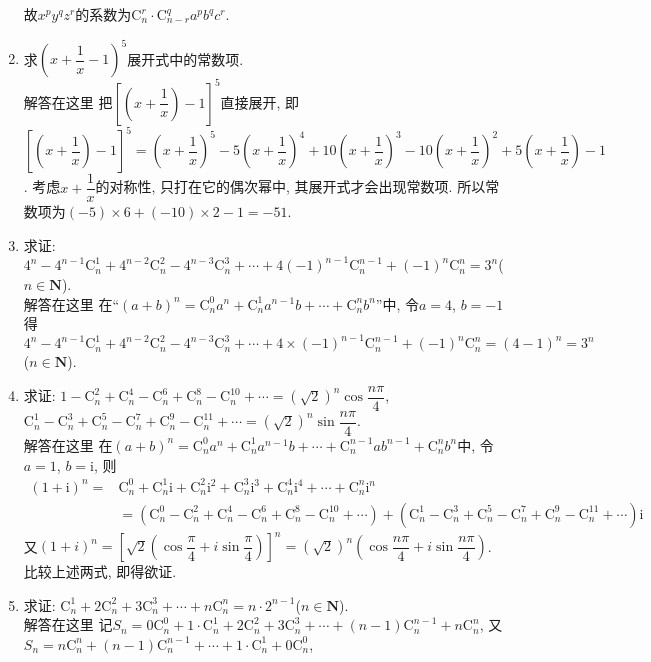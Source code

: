 \documentclass[10pt,a4paper]{article}
\begin{document}
\begin{enumerate}[1.]
故$x^py^qz^r$的系数为$\mathrm{C}_n^r\cdot \mathrm{C}_{n-r}^qa^pb^qc^r$.
\item 求$(x+\dfrac 1x-1)^5$展开式中的常数项.\\
解答在这里  把$[(x+\dfrac 1x)-1]^5$直接展开,
即$[(x+\dfrac 1x)-1]^5=(x+\dfrac 1x)^5-5(x+\dfrac 1x)^4+10(x+\dfrac 1x)^3-10(x+\dfrac 1x)^2+5(x+\dfrac 1x)-1$.
考虑$x+\dfrac 1x$的对称性, 只打在它的偶次幂中, 其展开式才会出现常数项.
所以常数项为$(-5)\times 6+(-10)\times 2-1=-51$.
\item 求证: $4^n-4^{n-1}\mathrm{C}_n^1+4^{n-2}\mathrm{C}_n^2-4^{n-3}\mathrm{C}_n^3+\cdots +4(-1)^{n-1}\mathrm{C}_n^{n-1}+(-1)^n\mathrm{C}_n^n=3^n$($n\in \mathbf{N}$).\\
解答在这里  在``$(a+b)^n=\mathrm{C}_n^0a^n+\mathrm{C}_n^1a^{n-1}b+\cdots +\mathrm{C}_n^nb^n$''中, 令$a=4$, $b=-1$得
$4^n-4^{n-1}\mathrm{C}_n^1+4^{n-2}\mathrm{C}_n^2-4^{n-3}\mathrm{C}_n^3+\cdots +4\times (-1)^{n-1}\mathrm{C}_n^{n-1}+(-1)^n\mathrm{C}_n^n=(4-1)^n=3^n$($n\in \mathbf{N}$).
\item 求证: $1-\mathrm{C}_n^2+\mathrm{C}_n^4-\mathrm{C}_n^6+\mathrm{C}_n^8-\mathrm{C}_n^{10}+\cdots =(\sqrt 2)^n\cos \dfrac{n\pi }4$,
$\mathrm{C}_n^1-\mathrm{C}_n^3+\mathrm{C}_n^5-\mathrm{C}_n^7+\mathrm{C}_n^9-\mathrm{C}_n^{11}+\cdots =(\sqrt 2)^n\sin \dfrac{n\pi }4$.\\
解答在这里  在$(a+b)^n=\mathrm{C}_n^0a^n+\mathrm{C}_n^1a^{n-1}b+\cdots +\mathrm{C}_n^{n-1}ab^{n-1}+\mathrm{C}_n^nb^n$中, 令$a=1$, $b=\mathrm{i}$, 则
\begin{align*} 
(1+\mathrm{i})^n=&\mathrm{C}_n^0+\mathrm{C}_n^1\mathrm{i}+\mathrm{C}_n^2\mathrm{i}^2+\mathrm{C}_n^3\mathrm{i}^3+\mathrm{C}_n^4\mathrm{i}^4+\cdots +\mathrm{C}_n^n\mathrm{i}^n \\ &=(\mathrm{C}_n^0-\mathrm{C}_n^2+\mathrm{C}_n^4-\mathrm{C}_n^6+\mathrm{C}_n^8-\mathrm{C}_n^{10}+\cdots)+(\mathrm{C}_n^1-\mathrm{C}_n^3+\mathrm{C}_n^5-\mathrm{C}_n^7+\mathrm{C}_n^9-\mathrm{C}_n^{11}+\cdots)\mathrm{i}
\end{align*}
又$(1+i)^n=[\sqrt 2(\cos \dfrac{\pi }4+i\sin \dfrac{\pi }4)]^n=(\sqrt 2)^n(\cos \dfrac{n\pi }4+i\sin \dfrac{n\pi }4)$.
比较上述两式, 即得欲证.
\item 求证: $\mathrm{C}_n^1+2\mathrm{C}_n^2+3\mathrm{C}_n^3+\cdots +n\mathrm{C}_n^n=n\cdot 2^{n-1}$($n\in \mathbf{N}$).\\
解答在这里  记$S_n=0\mathrm{C}_n^0+1\cdot \mathrm{C}_n^1+2\mathrm{C}_n^2+3\mathrm{C}_n^3+\cdots +(n-1)\mathrm{C}_n^{n-1}+n\mathrm{C}_n^n$,
又$S_n=n\mathrm{C}_n^n+(n-1)\mathrm{C}_n^{n-1}+\cdots +1\cdot \mathrm{C}_n^1+0\mathrm{C}_n^0$,

\end{enumerate}
\end{document}
